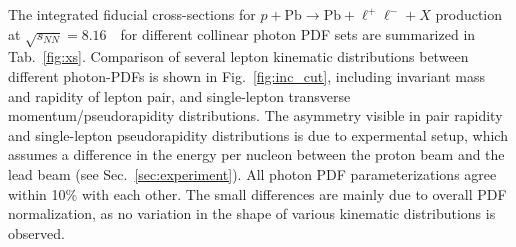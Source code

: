 The integrated fiducial cross-sections for $p+\textrm{Pb}\rightarrow \textrm{Pb} + \ell^+\ell^- + X$ production at $\sqrt{s_{N N}} = 8.16$~\TeV\ for different collinear photon PDF sets are summarized in Tab.~\ref{fig:xs}.
Comparison of several lepton kinematic distributions between different photon-PDFs is shown in Fig.~\ref{fig:inc_cut}, including invariant mass and rapidity of lepton pair, and single-lepton transverse momentum/pseudorapidity distributions. 
The asymmetry visible in pair rapidity and single-lepton pseudorapidity distributions is due to expermental setup, which assumes a difference in the energy per nucleon between the proton beam and the lead beam (see Sec.~\ref{sec:experiment}).
All photon PDF parameterizations agree within 10\% with each other.
The small differences are mainly due to overall PDF normalization, as no variation in the shape of various kinematic distributions is observed.

%
%

